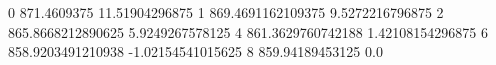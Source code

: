 0 871.4609375 11.51904296875
1 869.4691162109375 9.5272216796875
2 865.8668212890625 5.9249267578125
4 861.3629760742188 1.42108154296875
6 858.9203491210938 -1.02154541015625
8 859.94189453125 0.0
